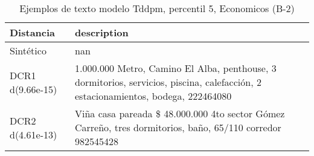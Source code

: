 \begin{table}[H]
\centering
\fontsize{10}{14}\selectfont
\caption{Ejemplos de texto modelo Tddpm, percentil 5, Economicos (B-2)}
\label{table-example-economicos-b-2-tddpm_mlp-5p-text}
\begin{tabular}{|l|m{35em}|}
\hline
\rowcolor[gray]{0.8}
Distancia & description \\
\hline Sintético & nan \\
\hline DCR1 d(9.66e-15) & 1.000.000 Metro, Camino El Alba, penthouse, 3 dormitorios, servicios, piscina, calefacci\'on, 2 estacionamientos, bodega, 222464080 \\
\hline DCR2 d(4.61e-13) & Vi\~na casa pareada \$ 48.000.000  4to sector G\'omez Carre\~no, tres dormitorios, ba\~no, 65/110 corredor 982545428 \\
\hline
\end{tabular}
\end{table}
